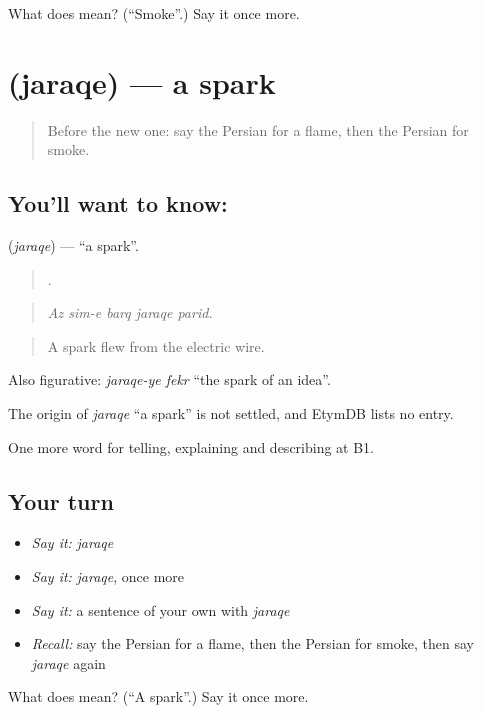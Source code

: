 \begin{tcolorbox}[breakable,colback=teal!4,colframe=teal!35!black,title={Before you move on}]
What does  mean? (\textquotedblleft{}Smoke\textquotedblright{}.) Say it once more.
\end{tcolorbox}
\section[\texorpdfstring{\fa{جرقه} (jaraqe)}{جرقه (jaraqe)}]{ (jaraqe) — a spark}

\label{lesson:FA-C328-jaraqe}



\begin{quote}
Before the new one: say the Persian for a flame, then the Persian for smoke.
\end{quote}

\subsection*{You'll want to know: }
\textbf{} (\emph{jaraqe}) — \textquotedblleft{}a spark\textquotedblright{}.

\begin{quote}
    .
\end{quote}

\begin{quote}
\emph{Az sim-e barq jaraqe parid.}
\end{quote}

\begin{quote}
A spark flew from the electric wire.
\end{quote}

Also figurative: \emph{jaraqe-ye fekr} \textquotedblleft{}the spark of an idea\textquotedblright{}.

\begin{cousinweb}
The origin of \emph{jaraqe} \textquotedblleft{}a spark\textquotedblright{} is not settled, and EtymDB lists no entry.
\end{cousinweb}

\begin{grammarlens}[title={What you've built}]
One more word for telling, explaining and describing at B1.
\end{grammarlens}

\subsection*{Your turn}
\begin{itemize}
\raggedright
  \item \emph{Say it:} \emph{jaraqe}
  \item \emph{Say it:} \emph{jaraqe}, once more
  \item \emph{Say it:} a sentence of your own with \emph{jaraqe}
  \item \emph{Recall:} say the Persian for a flame, then the Persian for smoke, then say \emph{jaraqe} again
\end{itemize}

\begin{tcolorbox}[breakable,colback=teal!4,colframe=teal!35!black,title={Before you move on}]
What does  mean? (\textquotedblleft{}A spark\textquotedblright{}.) Say it once more.
\end{tcolorbox}
